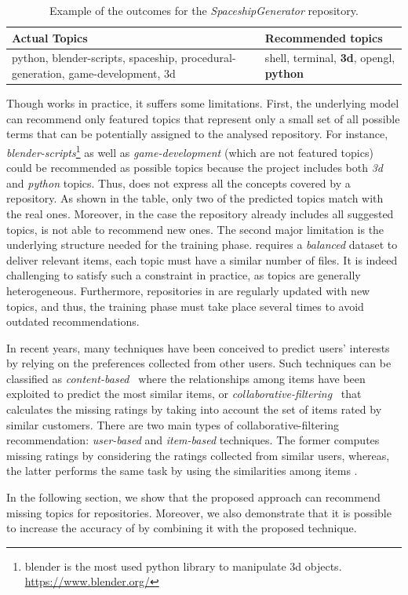 \begin{table}[h]
\centering
\resizebox{8.5cm}{!} {
\footnotesize
\begin{tabular}{| p{3.2cm} | p{3.2cm} | }
\hline
 \textbf{Actual Topics} &\textbf{ Recommended topics} \\ \hline
     python, blender-scripts, spaceship, procedural-generation, 
     game-development, 3d        &  
  shell, terminal, \textbf{3d},    opengl,    \textbf{python}        \\ \hline

\end{tabular}
}
\caption{Example of the \MNB outcomes for the \emph{SpaceshipGenerator} repository.}
\label{tab:example}
\end{table} 


Though \MNB works in practice, it suffers some limitations. First, the 
underlying model can recommend only featured topics that represent only a small 
set of all possible terms that can be potentially assigned to the analysed 
repository.
%
For instance, \emph{blender-scripts}\footnote{blender is the most used python 
library to manipulate 3d objects. \url{https://www.blender.org/}} as well as 
\emph{game-development} (which are not featured topics) could be recommended as 
possible topics because the project includes both \emph{3d} and \emph{python} 
topics. Thus, \MNB does not express all the concepts covered by a \GH 
repository. As shown in the table, only two of the predicted topics match 
with the real ones. Moreover, in the case the repository already includes all 
suggested topics, \MNB is not able to recommend new ones.
The second major limitation is the underlying structure needed for the training 
phase. \MNB requires a \emph{balanced} dataset to deliver relevant items, 
\ie each topic must have a similar number of \RM files. It is indeed challenging to satisfy such a constraint in practice, as topics are generally heterogeneous. 
Furthermore, repositories in \GH are regularly updated with new topics, and 
thus, the training phase must take place several times to avoid outdated 
recommendations. 

In recent years, many techniques have been conceived to predict users' interests 
by relying on the preferences collected from other users. Such techniques can 
be classified as  \emph{content-based}~\cite{Pazzani2007} where the 
relationships among items have been exploited to predict the most similar items,
or \emph{collaborative-filtering}~\cite{Miranda:2008:ICF:1486927.1487083} that 
calculates the missing ratings by taking into account the set of items rated by 
similar customers. There are two main types of collaborative-filtering 
recommendation: \emph{user-based} \cite{Zhao:2010:UCR:1748610.1749278} and 
\emph{item-based} \cite{Sarwar:2001:ICF:371920.372071} techniques. The former 
computes missing ratings by considering the ratings collected from similar 
users, whereas, the latter performs the same task by using the similarities 
among items \cite{Cremonesi:2008:EMC:1468165.1468327}.

In the following section, we show that the proposed %
approach can recommend missing topics for \GH repositories. Moreover, we also 
demonstrate that it is possible to increase the accuracy of \MNB by combining 
it with the proposed technique.
